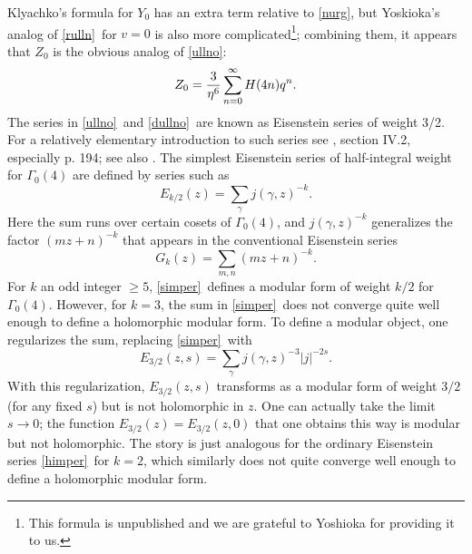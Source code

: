 \documentclass[12pt]{article}
\numberwithin{equation}{section}
\begin{document}
Klyachko's formula for $Y_0$ has an extra term relative to
\eqref{nurg}, but Yoskioka's analog of \eqref{rulln}\ for $v=0$ is also more
complicated\footnote{This formula is unpublished and we are grateful
to Yoshioka for providing it to us.}; combining them, it appears
that $Z_0$ is the obvious analog of \eqref{ullno}:
%
\begin{equation}
  \label{dullno}
  Z_0={3\over \eta^6}\sum_{n=0}^\infty H(4n)q^n.
\end{equation}
%
The series in \eqref{ullno}\ and \eqref{dullno}\ are known as Eisenstein series
of weight 3/2.  For a relatively elementary introduction to such series
see \cite{koblitz}, section IV.2, especially p. 194; see also
\cite{miyake}.  The simplest Eisenstein
series of half-integral weight for $\Gamma_0(4)$  are defined by
series such as
\begin{equation}
  \label{simper}
  E_{k/2}(z)=\sum_\gamma j(\gamma,z)^{-k}.
\end{equation}
Here the sum runs over certain cosets of $\Gamma_0(4)$, and
$j(\gamma,z)^{-k}$ generalizes the factor $(mz+n)^{-k}$ that
appears in the conventional Eisenstein series
\begin{equation}
  \label{defjo}
  G_k(z)=\sum_{m,n}(mz+n)^{-k}.
\end{equation}
For $k$ an odd integer $\geq 5$, \eqref{simper}\ defines a modular form
of weight $k/2$ for $\Gamma_0(4)$.  However, for $k=3$, the sum
in \eqref{simper}\ does not converge quite well enough to define a holomorphic
modular form.  To define a modular object, one regularizes the sum,
replacing \eqref{simper}\ with
\begin{equation}
  \label{himper}
  E_{3/2}(z,s)=\sum_\gamma j(\gamma,z)^{-3}|j|^{-2s}.
\end{equation}
With this regularization, $E_{3/2}(z,s)$ transforms as a modular
form of weight $3/2$ (for any fixed $s$) but is not holomorphic in $z$.
One can actually take the limit $s\to 0$; the function
$E_{3/2}(z)=E_{3/2}(z,0)$ that one obtains this way is modular
but not holomorphic.  The story is just analogous for the ordinary
Eisenstein series \eqref{himper}\ for $k=2$, which similarly does not
quite converge
well enough to define a holomorphic modular form.
\end{document}
